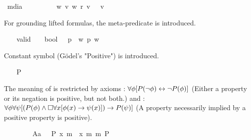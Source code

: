 \begin{isabellebody}
\ mdia\ {\isacharcolon}{\isacharcolon}\ {\isachardoublequoteopen}{\isasymsigma}\ {\isasymRightarrow}\ {\isasymsigma}{\isachardoublequoteclose}\ {\isacharparenleft}{\isachardoublequoteopen}{\isasymdiamond}{\isachardoublequoteclose}{\isacharparenright}\ \ {\isachardoublequoteopen}{\isasymdiamond}\ {\isasymphi}\ {\isasymequiv}\ {\isacharparenleft}{\isasymlambda}w{\isachardot}\ {\isasymexists}v{\isachardot}\ w\ r\ v\ {\isasymand}\ {\isasymphi}\ v{\isacharparenright}{\isachardoublequoteclose}%
\begin{isamarkuptext}%
For grounding lifted formulas, the meta-predicate  is introduced.%
\end{isamarkuptext}%
\isamarkuptrue%
\ \ \isamarkupfalse%
\ valid\ {\isacharcolon}{\isacharcolon}\ {\isachardoublequoteopen}{\isasymsigma}\ {\isasymRightarrow}\ bool{\isachardoublequoteclose}\ {\isacharparenleft}{\isachardoublequoteopen}{\isacharbrackleft}{\isacharunderscore}{\isacharbrackright}{\isachardoublequoteclose}{\isacharparenright}\ \ {\isachardoublequoteopen}{\isacharbrackleft}p{\isacharbrackright}\ {\isasymequiv}\ {\isasymforall}w{\isachardot}\ p\ w{\isachardoublequoteclose}%
\isamarkuptrue%
%
\begin{isamarkuptext}%
Constant symbol  (G\"odel's "Positive") is introduced.%
\end{isamarkuptext}%
\isamarkuptrue%
\ \ \isamarkupfalse%
\ P\ {\isacharcolon}{\isacharcolon}\ {\isachardoublequoteopen}{\isacharparenleft}{\isasymmu}\ {\isasymRightarrow}\ {\isasymsigma}{\isacharparenright}\ {\isasymRightarrow}\ {\isasymsigma}{\isachardoublequoteclose}%
\begin{isamarkuptext}%
The meaning of  is restricted by axioms : $\forall \phi 
[P(\neg \phi) \leftrightarrow \neg P(\phi)]$ (Either a property or its negation is positive, but not both.) 
and : $\forall \phi \forall \psi [(P(\phi) \wedge \Box \forall x [\phi(x) \rightarrow \psi(x)]) 
\rightarrow P(\psi)]$ (A property necessarily implied by a positive property is positive).%
\end{isamarkuptext}%
\isamarkuptrue%
\ \ \isamarkupfalse%
\ \isanewline
\ \ \ \ A{}a{\isacharcolon}\ {\isachardoublequoteopen}{\isacharbrackleft}{\isasymPi}\ {\isacharparenleft}{\isasymlambda}{\isasymPhi}{\isachardot}\ P\ {\isacharparenleft}{\isasymlambda}x{\isachardot}\ m{\isasymnot}\ {\isacharparenleft}{\isasymPhi}\ x{\isacharparenright}{\isacharparenright}\ m{\isasymRightarrow}\ m{\isasymnot}\ {\isacharparenleft}P\ {\isasymPhi}{\isacharparenright}{\isacharparenright}{\isacharbrackright}{\isachardoublequoteclose}\ \isanewline

\end{isabellebody}
